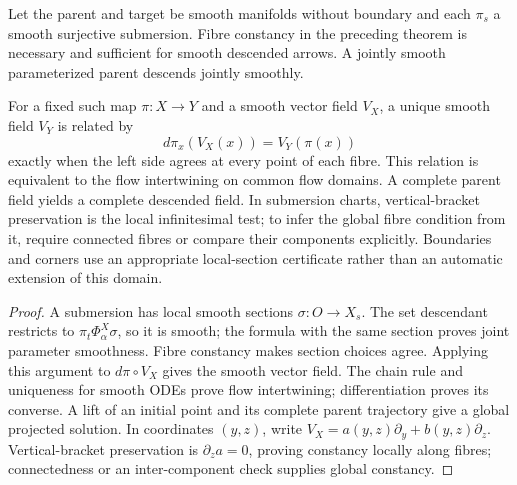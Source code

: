 \documentclass[12pt,a4paper]{article}
\begin{document}
\begin{corollary}
\label{p3a:cor:v166-smooth-process-descent}
Let the parent and target be smooth manifolds without boundary and each
\(\pi_s\) a smooth surjective submersion. Fibre constancy in the preceding
theorem is necessary and sufficient for smooth descended arrows. A jointly
smooth parameterized parent descends jointly smoothly.

For a fixed such map \(\pi:X\to Y\) and a smooth vector field \(V_X\),
a unique smooth field \(V_Y\) is related by
\[
 d\pi_x(V_X(x))=V_Y(\pi(x))
\]
exactly when the left side agrees at every point of each fibre. This relation
is equivalent to the flow intertwining on common flow domains. A complete
parent field yields a complete descended field. In submersion charts,
vertical-bracket preservation is the local infinitesimal test; to infer the
global fibre condition from it, require connected fibres or compare their
components explicitly. Boundaries and corners use an appropriate local-section
certificate rather than an automatic extension of this domain.
\end{corollary}
\begin{proof}
A submersion has local smooth sections \(\sigma:O\to X_s\). The set
descendant restricts to \(\pi_t\Phi_\alpha^X\sigma\), so it is smooth;
the formula with the same section proves joint parameter smoothness. Fibre
constancy makes section choices agree. Applying this argument to
\(d\pi\circ V_X\) gives the smooth vector field. The chain rule and
uniqueness for smooth ODEs prove flow intertwining; differentiation proves
its converse. A lift of an initial point and its complete parent trajectory
give a global projected solution. In coordinates \((y,z)\), write
\(V_X=a(y,z)\partial_y+b(y,z)\partial_z\). Vertical-bracket preservation
is \(\partial_z a=0\), proving constancy locally along fibres; connectedness
or an inter-component check supplies global constancy.
\end{proof}
\end{document}
